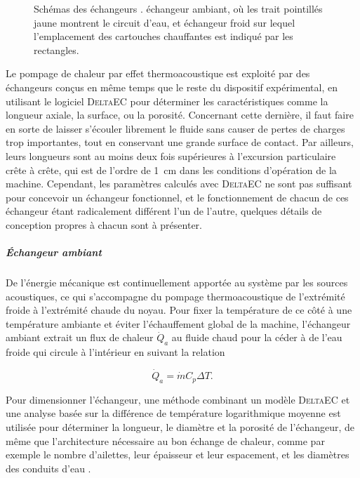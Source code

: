 \begin{figure}[!ht]
\begin{subfigure}[c]{.47\textwidth}
		\caption{}
		\label{fig:CHXschema}
	\end{subfigure}	    
    \caption{Schémas des échangeurs \cite{ramadan_design_2021}.  échangeur ambiant, où les trait pointillés jaune montrent le circuit d'eau, et  échangeur froid sur lequel l'emplacement des cartouches chauffantes est indiqué par les rectangles. }
    \label{fig:HXschema}
\end{figure}

Le pompage de chaleur par effet thermoacoustique est exploité par des échangeurs conçus en même temps que le reste du dispositif expérimental, en utilisant le logiciel \textsc{DeltaEC} pour déterminer les caractéristiques comme la longueur axiale, la surface, ou la porosité. Concernant cette dernière, il faut faire en sorte de laisser s'écouler librement le fluide sans causer de pertes de charges trop importantes, tout en conservant une grande surface de contact. Par ailleurs, leurs longueurs sont au moins deux fois supérieures à l'excursion particulaire crête à crête, qui est de l'ordre de \qty{1}{\centi\meter} dans les conditions d'opération de la machine. Cependant, les paramètres calculés avec \textsc{DeltaEC} ne sont pas suffisant pour concevoir un échangeur fonctionnel, et le fonctionnement de chacun de ces échangeur étant radicalement différent l'un de l'autre, quelques détails de conception propres à chacun sont à présenter.

\subparagraph{\'Echangeur ambiant} 
De l'énergie mécanique est continuellement apportée au système par les sources acoustiques, ce qui s'accompagne du pompage thermoacoustique de l'extrémité froide à l'extrémité chaude du noyau. Pour fixer la température de ce côté à une température ambiante et éviter l'échauffement global de la machine, l'échangeur ambiant extrait un flux de chaleur $\dot Q_a$ au fluide chaud pour la céder à de l'eau froide qui circule à l'intérieur en suivant la relation 

\begin{equation}
	\dot Q_a = \dot m C_p \Delta T.
	\label{eq:Qa_Definition}
\end{equation}

Pour dimensionner l'échangeur, une méthode combinant un modèle \textsc{DeltaEC} et une analyse basée sur la différence de température logarithmique moyenne est utilisée pour déterminer la longueur, le diamètre et la porosité de l'échangeur, de même que l'architecture nécessaire au bon échange de chaleur, comme par exemple le nombre d'ailettes, leur épaisseur et leur espacement, et les diamètres des conduits d'eau \cite{ramadan_design_2021}. \smallskip

